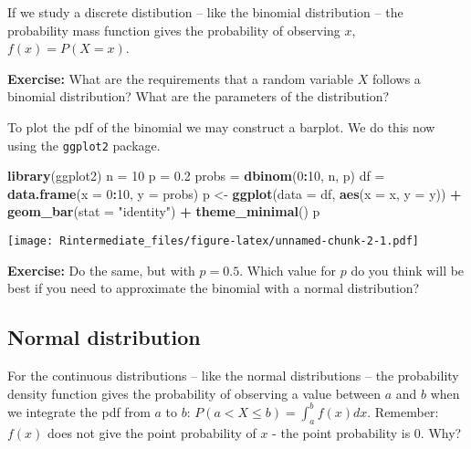 \documentclass[]{article}
\newenvironment{Shaded}{\begin{snugshade}}{\end{snugshade}}
\newcommand{\KeywordTok}[1]{\textcolor[rgb]{0.13,0.29,0.53}{\textbf{#1}}}
\newcommand{\DataTypeTok}[1]{\textcolor[rgb]{0.13,0.29,0.53}{#1}}
\newcommand{\DecValTok}[1]{\textcolor[rgb]{0.00,0.00,0.81}{#1}}
\newcommand{\FloatTok}[1]{\textcolor[rgb]{0.00,0.00,0.81}{#1}}
\newcommand{\StringTok}[1]{\textcolor[rgb]{0.31,0.60,0.02}{#1}}
\newcommand{\OperatorTok}[1]{\textcolor[rgb]{0.81,0.36,0.00}{\textbf{#1}}}
\newcommand{\NormalTok}[1]{#1}
\begin{document}
If we study a discrete distibution -- like the binomial distribution --
the probability mass function gives the probability of observing \(x\),
\(f(x) = P(X = x)\).

\textbf{Exercise:} What are the requirements that a random variable
\(X\) follows a binomial distribution? What are the parameters of the
distribution?

\begingroup\color{dg}

\endgroup

To plot the pdf of the binomial we may construct a barplot. We do this
now using the \texttt{ggplot2} package.

\begin{Shaded}
\begin{Highlighting}[]
\KeywordTok{library}\NormalTok{(ggplot2)}
\NormalTok{n =}\StringTok{ }\DecValTok{10}
\NormalTok{p =}\StringTok{ }\FloatTok{0.2}
\NormalTok{probs =}\StringTok{ }\KeywordTok{dbinom}\NormalTok{(}\DecValTok{0}\OperatorTok{:}\DecValTok{10}\NormalTok{, n, p)}
\NormalTok{df =}\StringTok{ }\KeywordTok{data.frame}\NormalTok{(}\DataTypeTok{x =} \DecValTok{0}\OperatorTok{:}\DecValTok{10}\NormalTok{, }\DataTypeTok{y =}\NormalTok{ probs)}
\NormalTok{p <-}\StringTok{ }\KeywordTok{ggplot}\NormalTok{(}\DataTypeTok{data =}\NormalTok{ df, }\KeywordTok{aes}\NormalTok{(}\DataTypeTok{x =}\NormalTok{ x, }\DataTypeTok{y =}\NormalTok{ y)) }\OperatorTok{+}\StringTok{ }\KeywordTok{geom_bar}\NormalTok{(}\DataTypeTok{stat =} \StringTok{"identity"}\NormalTok{) }\OperatorTok{+}\StringTok{ }
\StringTok{    }\KeywordTok{theme_minimal}\NormalTok{()}
\NormalTok{p}
\end{Highlighting}
\end{Shaded}

\texttt{[image: Rintermediate\_files/figure-latex/unnamed-chunk-2-1.pdf]}

\textbf{Exercise:} Do the same, but with \(p=0.5\). Which value for
\(p\) do you think will be best if you need to approximate the binomial
with a normal distribution?

\begingroup\color{dg}

\endgroup

\subsection{Normal distribution}\label{normal-distribution}

For the continuous distributions -- like the normal distributions -- the
probability density function gives the probability of observing a value
between \(a\) and \(b\) when we integrate the pdf from \(a\) to \(b\):
\(P(a<X \le b)=\int_{a}^b f(x) dx\). Remember: \(f(x)\) does not give
the point probability of \(x\) - the point probability is 0. Why?
\end{document}
